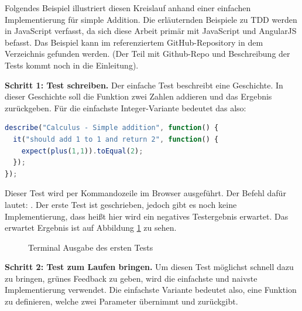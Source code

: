 Folgendes Beispiel illustriert diesen Kreislauf anhand einer einfachen Implementierung für simple Addition. Die erläuternden Beispiele zu TDD werden in JavaScript verfasst, da sich diese Arbeit primär mit JavaScript und AngularJS befasst. Das Beispiel kann im referenziertem GitHub-Repository in dem Verzeichnis  gefunden werden. (Der Teil mit Github-Repo und Beschreibung der Tests kommt noch in die Einleitung).

\textbf{Schritt 1: Test schreiben.}\newline
Der einfache Test beschreibt eine Geschichte. In dieser Geschichte soll die Funktion  zwei Zahlen addieren und das Ergebnis zurückgeben. Für die einfachste Integer-Variante bedeutet das also: 

\begin{lstlisting}[language=JavaScript]
describe("Calculus - Simple addition", function() {
  it("should add 1 to 1 and return 2", function() {
    expect(plus(1,1)).toEqual(2);
  });
});
\end{lstlisting}

Dieser Test wird per Kommandozeile im Browser  ausgeführt. Der Befehl dafür lautet: . Der erste Test ist geschrieben, jedoch gibt es noch keine Implementierung, dass heißt hier wird ein negatives Testergebnis erwartet. Das erwartet Ergebnis ist auf Abbildung \ref{figure:tdd-simple-step-1-1} zu sehen.

\begin{figure}[H]
  \centering
  \caption{Terminal Ausgabe des ersten Tests}
  \label{figure:tdd-simple-step-1-1}
\end{figure}

\textbf{Schritt 2: Test zum Laufen bringen.}\newline
Um diesen Test möglichst schnell dazu zu bringen, grünes Feedback zu geben, wird die einfachste und naivste Implementierung verwendet. Die einfachste Variante bedeutet also, eine Funktion zu definieren, welche zwei Parameter übernimmt und \glqq{2\grqq} zurückgibt.

